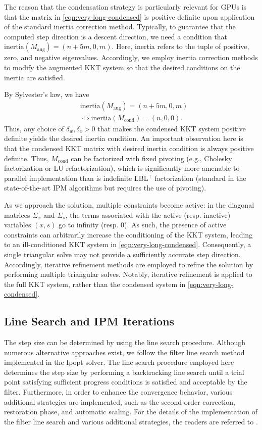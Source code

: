 \documentclass{IEEEtran4PSCC} %
\begin{document}
The reason that the condensation strategy is particularly relevant for
GPUs is that the matrix in \eqref{eqn:very-long-condensed} is positive
definite upon  application of the standard inertia correction
method. Typically, to guarantee that the computed step direction is a
descent direction, we need a condition that
$\text{inertia}(M_\text{aug}) = (n+5m,0,m)$. Here, inertia refers to
the tuple of positive, zero, and negative eigenvalues. Accordingly, we
employ inertia correction methods to modify the augmented KKT system
so that the desired conditions on the inertia are satisfied.

By Sylvester's law, we have
\begin{align*}
  &\text{inertia}(M_\text{aug}) = (n+5m,0,m)\\
  &\iff \text{inertia}(M_\text{cond}) = (n,0,0).
\end{align*}
Thus, any choice of $\delta_w,\delta_c>0$ that makes the condensed KKT
system positive definite yields the desired inertia condition.
An important observation here is that the condensed KKT matrix
with desired inertia condition is always positive definite.
Thus, $M_{\text{cond}}$ can be factorized with fixed pivoting (e.g.,
Cholesky factorization or LU refactorization), which is significantly
more amenable to parallel implementation than is indefinite LBL$^\top$
factorization (standard in the state-of-the-art IPM
algorithms but requires the use of pivoting).

As we approach the solution, multiple constraints become active:
in the diagonal matrices $\Sigma_x$ and $\Sigma_s$, the terms associated
with the active (resp. inactive) variables $(x, s)$ go to infinity
(resp. $0$).
As such, the presence of active constraints can arbitrarily
increase the conditioning of the KKT system, leading to
an ill-conditioned KKT system in \eqref{eqn:very-long-condensed}.
Consequently, a single triangular solve may not provide a
sufficiently accurate step direction. Accordingly, iterative
refinement methods are employed to refine the solution by performing
multiple triangular solves. Notably, iterative refinement is applied
to the full KKT system, rather than the condensed system in
\eqref{eqn:very-long-condensed}.

\subsection{Line Search and IPM Iterations}

The step size can be determined by using the line search procedure.
Although  numerous alternative approaches exist, we follow the
filter line search method implemented in the Ipopt solver. The line
search procedure employed here determines the step size by performing
a backtracking line search until a trial point satisfying sufficient
progress conditions is satisfied and acceptable by the
filter. Furthermore, in order to enhance the convergence behavior, various
additional strategies are implemented, such as the second-order
correction, restoration phase, and automatic scaling. For the details
of the implementation of the filter line search and various additional
strategies, the readers are referred to
\cite{wachter2006implementation}.
\end{document}

